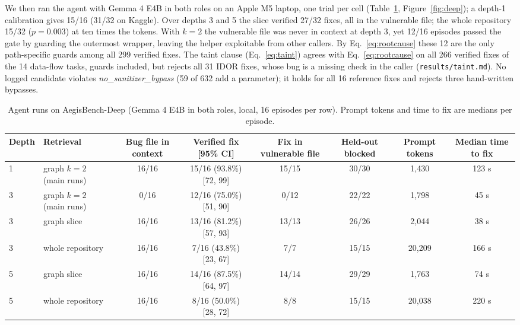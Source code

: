 \documentclass[10pt,a4paper]{article}
\newcommand{\code}[1]{\texttt{#1}}
\begin{document}
We then ran the agent with Gemma 4 E4B in both roles on an Apple M5 laptop, one trial per cell (Table~\ref{tab:deep}, Figure~\ref{fig:deep}); a depth-1 calibration gives 15/16 (31/32 on Kaggle). Over depths 3 and 5 the slice verified 27/32 fixes, all in the vulnerable file; the whole repository 15/32 ($p = 0.003$) at ten times the tokens. With $k = 2$ the vulnerable file was never in context at depth 3, yet 12/16 episodes passed the gate by guarding the outermost wrapper, leaving the helper exploitable from other callers. By Eq.~\ref{eq:rootcause} these 12 are the only path-specific guards among all 299 verified fixes. The taint clause (Eq.~\ref{eq:taint}) agrees with Eq.~\ref{eq:rootcause} on all 266 verified fixes of the 14 data-flow tasks, guards included, but rejects all 31 IDOR fixes, whose bug is a missing check in the caller (\code{results/taint.md}). No logged candidate violates \emph{no\_sanitizer\_bypass} (59 of 632 add a parameter); it holds for all 16 reference fixes and rejects three hand-written bypasses.

\begin{table}[H]
\centering\small
\caption{Agent runs on AegisBench-Deep (Gemma 4 E4B in both roles, local, 16 episodes per row). Prompt tokens and time to fix are medians per episode.}
\label{tab:deep}
\begin{adjustbox}{max width=\linewidth}\begin{tabular}{llcccccc}
\toprule
Depth & Retrieval & Bug file in context & Verified fix [95\% CI] & Fix in vulnerable file & Held-out blocked & Prompt tokens & Median time to fix\\
\midrule
1 & graph $k{=}2$ (main runs) & 16/16 & 15/16 (93.8\%) [72, 99] & 15/15 & 30/30 & 1,430 & 123 s\\
3 & graph $k{=}2$ (main runs) & 0/16 & 12/16 (75.0\%) [51, 90] & 0/12 & 22/22 & 1,798 & 45 s\\
3 & graph slice & 16/16 & 13/16 (81.2\%) [57, 93] & 13/13 & 26/26 & 2,044 & 38 s\\
3 & whole repository & 16/16 & 7/16 (43.8\%) [23, 67] & 7/7 & 15/15 & 20,209 & 166 s\\
5 & graph slice & 16/16 & 14/16 (87.5\%) [64, 97] & 14/14 & 29/29 & 1,763 & 74 s\\
5 & whole repository & 16/16 & 8/16 (50.0\%) [28, 72] & 8/8 & 15/15 & 20,038 & 220 s\\
\bottomrule
\end{tabular}\end{adjustbox}
\end{table}
\end{document}
